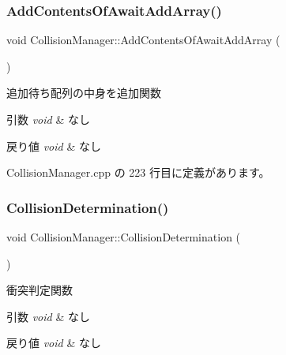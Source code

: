 \subsubsection{\texorpdfstring{Add\+Contents\+Of\+Await\+Add\+Array()}{AddContentsOfAwaitAddArray()}}
{\footnotesize\ttfamily void Collision\+Manager\+::\+Add\+Contents\+Of\+Await\+Add\+Array (\begin{DoxyParamCaption}{ }\end{DoxyParamCaption})\hspace{0.3cm}{\ttfamily [private]}}



追加待ち配列の中身を追加関数 


\begin{DoxyParams}{引数}
{\em void} & なし \\
\hline
\end{DoxyParams}

\begin{DoxyRetVals}{戻り値}
{\em void} & なし \\
\hline
\end{DoxyRetVals}


 Collision\+Manager.\+cpp の 223 行目に定義があります。

\mbox{\label{class_collision_manager_a67c1ebc4d4a19e06122f11c3eeec89ec}} 
\subsubsection{\texorpdfstring{Collision\+Determination()}{CollisionDetermination()}}
{\footnotesize\ttfamily void Collision\+Manager\+::\+Collision\+Determination (\begin{DoxyParamCaption}{ }\end{DoxyParamCaption})\hspace{0.3cm}{\ttfamily [private]}}



衝突判定関数 


\begin{DoxyParams}{引数}
{\em void} & なし \\
\hline
\end{DoxyParams}

\begin{DoxyRetVals}{戻り値}
{\em void} & なし \\
\hline
\end{DoxyRetVals}


